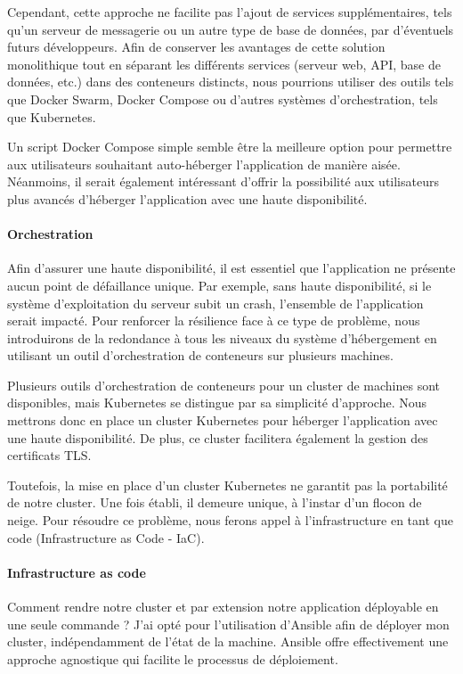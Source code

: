 Cependant, cette approche ne facilite pas l'ajout de services supplémentaires, tels qu'un serveur de messagerie ou un autre type de base de données, par d'éventuels futurs développeurs.
Afin de conserver les avantages de cette solution monolithique tout en séparant les différents services (serveur web, API, base de données, etc.) dans des conteneurs distincts, nous pourrions utiliser des outils tels que Docker Swarm, Docker Compose ou d'autres systèmes d'orchestration, tels que Kubernetes.

Un script Docker Compose simple semble être la meilleure option pour permettre aux utilisateurs souhaitant auto-héberger l'application de manière aisée.
Néanmoins, il serait également intéressant d'offrir la possibilité aux utilisateurs plus avancés d'héberger l'application avec une haute disponibilité.

\paragraph{Orchestration}
Afin d'assurer une haute disponibilité, il est essentiel que l'application ne présente aucun point de défaillance unique.
Par exemple, sans haute disponibilité, si le système d'exploitation du serveur subit un crash, l'ensemble de l'application serait impacté.
Pour renforcer la résilience face à ce type de problème,
nous introduirons de la redondance à tous les niveaux du système d'hébergement en utilisant un outil d'orchestration de conteneurs sur plusieurs machines.

Plusieurs outils d'orchestration de conteneurs pour un cluster de machines sont disponibles, mais Kubernetes se distingue par sa simplicité d'approche.
Nous mettrons donc en place un cluster Kubernetes pour héberger l'application avec une haute disponibilité.
De plus, ce cluster facilitera également la gestion des certificats TLS\@.

Toutefois, la mise en place d'un cluster Kubernetes ne garantit pas la portabilité de notre cluster.
Une fois établi, il demeure unique, à l'instar d'un flocon de neige.
Pour résoudre ce problème, nous ferons appel à l'infrastructure en tant que code (Infrastructure as Code - IaC).

\paragraph{Infrastructure as code}
Comment rendre notre cluster et par extension notre application déployable en une seule commande ?
J'ai opté pour l'utilisation d'Ansible afin de déployer mon cluster, indépendamment de l'état de la machine.
Ansible offre effectivement une approche agnostique qui facilite le processus de déploiement.

